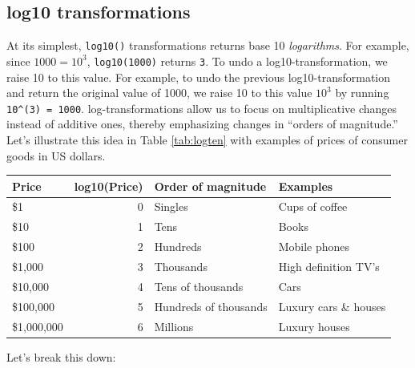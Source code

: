 \documentclass[12pt,]{krantz}
\theoremstyle{definition}
\theoremstyle{definition}
\theoremstyle{definition}
\theoremstyle{remark}
\begin{document}
\subsection{log10 transformations}\label{log10-transformations}

At its simplest, \texttt{log10()} transformations returns base 10
\emph{logarithms}. For example, since \(1000 = 10^3\),
\texttt{log10(1000)} returns \texttt{3}. To undo a log10-transformation,
we raise 10 to this value. For example, to undo the previous
log10-transformation and return the original value of 1000, we raise 10
to this value \(10^{3}\) by running \texttt{10\^{}(3)\ =\ 1000}.
log-transformations allow us to focus on multiplicative changes instead
of additive ones, thereby emphasizing changes in ``orders of
magnitude.'' Let's illustrate this idea in Table \ref{tab:logten} with
examples of prices of consumer goods in US dollars.

\begin{table}[H]
\centering\begingroup\fontsize{10}{12}\selectfont

\begin{tabular}{lrll}
\toprule
Price & log10(Price) & Order of magnitude & Examples\\
\midrule
\$1 & 0 & Singles & Cups of coffee\\
\$10 & 1 & Tens & Books\\
\$100 & 2 & Hundreds & Mobile phones\\
\$1,000 & 3 & Thousands & High definition TV's\\
\$10,000 & 4 & Tens of thousands & Cars\\
\addlinespace
\$100,000 & 5 & Hundreds of thousands & Luxury cars \& houses\\
\$1,000,000 & 6 & Millions & Luxury houses\\
\bottomrule
\end{tabular}
\endgroup{}
\end{table}

Let's break this down:
\end{document}
